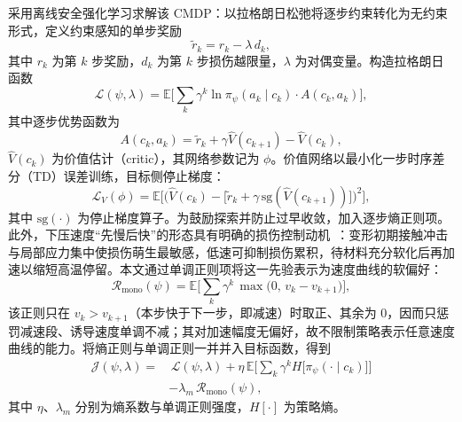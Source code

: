 采用离线安全强化学习求解该 CMDP：以拉格朗日松弛将逐步约束转化为无约束形式，定义约束感知的单步奖励
\begin{equation}
\tilde r_k=r_k-\lambda\,d_k,
\end{equation}
其中 $r_k$ 为第 $k$ 步奖励，$d_k$ 为第 $k$ 步损伤越限量，$\lambda$ 为对偶变量。构造拉格朗日函数
\begin{equation}
\mathcal{L}(\psi,\lambda)=\mathbb{E}\Big[\sum_{k}\gamma^{k}\ln \pi_{\psi}(a_k\mid c_k)\cdot A(c_k,a_k)\Big],
\end{equation}
其中逐步优势函数为
\begin{equation}
A(c_k,a_k)=\tilde r_k+\gamma\hat{V}(c_{k+1})-\hat{V}(c_k),
\end{equation}
$\hat{V}(c_k)$ 为价值估计（critic），其网络参数记为 $\phi$。价值网络以最小化一步时序差分（TD）误差训练，目标侧停止梯度：
\begin{equation}
\mathcal{L}_{V}(\phi)=\mathbb{E}\Big[\big(\hat{V}(c_k)-\big[\tilde r_k+\gamma\,\mathrm{sg}(\hat{V}(c_{k+1}))\big]\big)^{2}\Big],
\end{equation}
其中 $\mathrm{sg}(\cdot)$ 为停止梯度算子。为鼓励探索并防止过早收敛，加入逐步熵正则项。此外，下压速度“先慢后快”的形态具有明确的损伤控制动机~\cite{bambach2018towards}：变形初期接触冲击与局部应力集中使损伤萌生最敏感，低速可抑制损伤累积，待材料充分软化后再加速以缩短高温停留。本文通过单调正则项将这一先验表示为速度曲线的软偏好：
\begin{equation}
\mathcal{R}_{\text{mono}}(\psi)=\mathbb{E}\Big[\sum_{k}\gamma^{k}\,\max\big(0,\,v_k-v_{k+1}\big)\Big],
\end{equation}
该正则只在 $v_k>v_{k+1}$（本步快于下一步，即减速）时取正、其余为 0，因而只惩罚减速段、诱导速度单调不减；其对加速幅度无偏好，故不限制策略表示任意速度曲线的能力。将熵正则与单调正则一并并入目标函数，得到
\begin{equation}
\begin{aligned}
\mathcal{J}(\psi,\lambda)=&\,\mathcal{L}(\psi,\lambda)+\eta\,\mathbb{E}\Big[\sum_{k}\gamma^{k}H\big[\pi_{\psi}(\cdot\mid c_k)\big]\Big]\\
&-\lambda_m\,\mathcal{R}_{\text{mono}}(\psi),
\end{aligned}
\end{equation}
其中 $\eta$、$\lambda_m$ 分别为熵系数与单调正则强度，$H[\cdot]$ 为策略熵。


